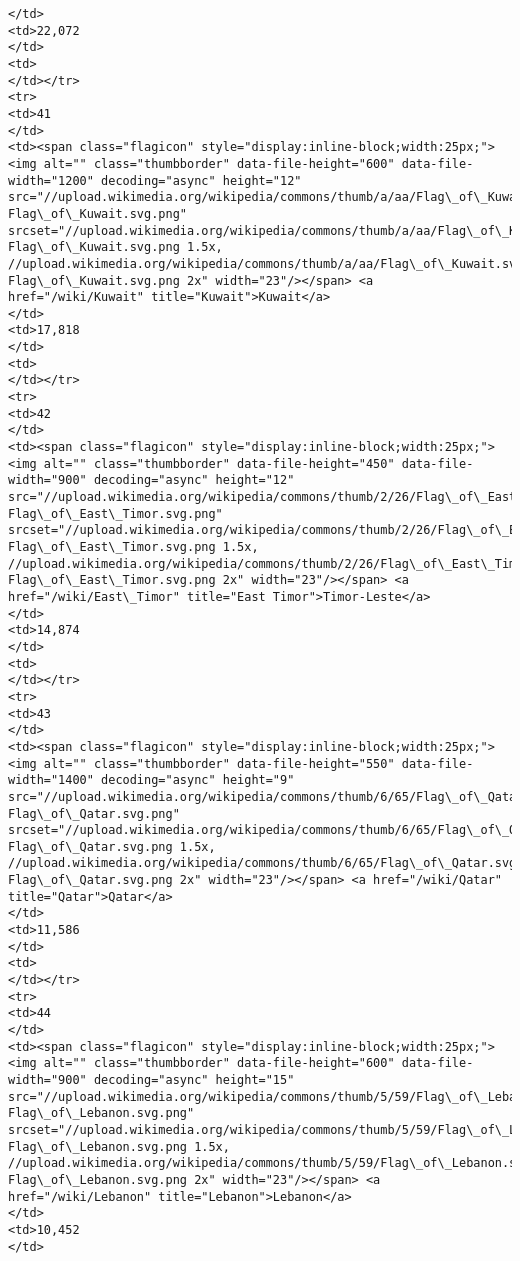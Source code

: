 \documentclass[11pt]{article}
\begin{document}
\begin{Verbatim}[commandchars=\\\{\}]
</td>
<td>22,072
</td>
<td>
</td></tr>
<tr>
<td>41
</td>
<td><span class="flagicon" style="display:inline-block;width:25px;"><img alt="" class="thumbborder" data-file-height="600" data-file-width="1200" decoding="async" height="12" src="//upload.wikimedia.org/wikipedia/commons/thumb/a/aa/Flag\_of\_Kuwait.svg/23px-Flag\_of\_Kuwait.svg.png" srcset="//upload.wikimedia.org/wikipedia/commons/thumb/a/aa/Flag\_of\_Kuwait.svg/35px-Flag\_of\_Kuwait.svg.png 1.5x, //upload.wikimedia.org/wikipedia/commons/thumb/a/aa/Flag\_of\_Kuwait.svg/46px-Flag\_of\_Kuwait.svg.png 2x" width="23"/></span> <a href="/wiki/Kuwait" title="Kuwait">Kuwait</a>
</td>
<td>17,818
</td>
<td>
</td></tr>
<tr>
<td>42
</td>
<td><span class="flagicon" style="display:inline-block;width:25px;"><img alt="" class="thumbborder" data-file-height="450" data-file-width="900" decoding="async" height="12" src="//upload.wikimedia.org/wikipedia/commons/thumb/2/26/Flag\_of\_East\_Timor.svg/23px-Flag\_of\_East\_Timor.svg.png" srcset="//upload.wikimedia.org/wikipedia/commons/thumb/2/26/Flag\_of\_East\_Timor.svg/35px-Flag\_of\_East\_Timor.svg.png 1.5x, //upload.wikimedia.org/wikipedia/commons/thumb/2/26/Flag\_of\_East\_Timor.svg/46px-Flag\_of\_East\_Timor.svg.png 2x" width="23"/></span> <a href="/wiki/East\_Timor" title="East Timor">Timor-Leste</a>
</td>
<td>14,874
</td>
<td>
</td></tr>
<tr>
<td>43
</td>
<td><span class="flagicon" style="display:inline-block;width:25px;"><img alt="" class="thumbborder" data-file-height="550" data-file-width="1400" decoding="async" height="9" src="//upload.wikimedia.org/wikipedia/commons/thumb/6/65/Flag\_of\_Qatar.svg/23px-Flag\_of\_Qatar.svg.png" srcset="//upload.wikimedia.org/wikipedia/commons/thumb/6/65/Flag\_of\_Qatar.svg/35px-Flag\_of\_Qatar.svg.png 1.5x, //upload.wikimedia.org/wikipedia/commons/thumb/6/65/Flag\_of\_Qatar.svg/46px-Flag\_of\_Qatar.svg.png 2x" width="23"/></span> <a href="/wiki/Qatar" title="Qatar">Qatar</a>
</td>
<td>11,586
</td>
<td>
</td></tr>
<tr>
<td>44
</td>
<td><span class="flagicon" style="display:inline-block;width:25px;"><img alt="" class="thumbborder" data-file-height="600" data-file-width="900" decoding="async" height="15" src="//upload.wikimedia.org/wikipedia/commons/thumb/5/59/Flag\_of\_Lebanon.svg/23px-Flag\_of\_Lebanon.svg.png" srcset="//upload.wikimedia.org/wikipedia/commons/thumb/5/59/Flag\_of\_Lebanon.svg/35px-Flag\_of\_Lebanon.svg.png 1.5x, //upload.wikimedia.org/wikipedia/commons/thumb/5/59/Flag\_of\_Lebanon.svg/45px-Flag\_of\_Lebanon.svg.png 2x" width="23"/></span> <a href="/wiki/Lebanon" title="Lebanon">Lebanon</a>
</td>
<td>10,452
</td>

\end{Verbatim}
\end{document}
